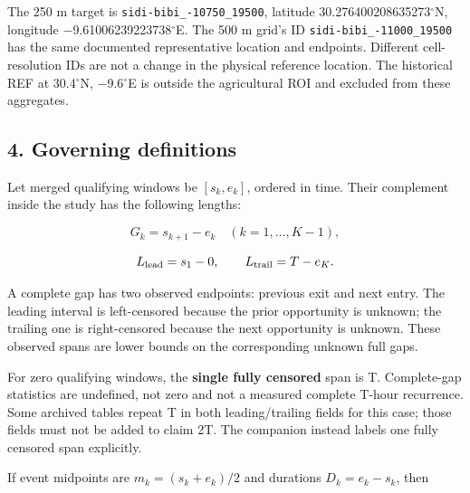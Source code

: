 \documentclass[10pt,a4paper]{article}
\numberwithin{equation}{section}
\begin{document}
\begin{sloppypar}The 250 m target is \nolinkurl{sidi-bibi_-10750_19500}, latitude 30.276400208635273\ensuremath{{}^{\circ}}N, longitude \ensuremath{-}9.61006239223738\ensuremath{{}^{\circ}}E. The 500 m grid's ID \nolinkurl{sidi-bibi_-11000_19500} has the same documented representative location and endpoints. Different cell-resolution IDs are not a change in the physical reference location. The historical REF at 30.4\ensuremath{{}^{\circ}}N, \ensuremath{-}9.6\ensuremath{{}^{\circ}}E is outside the agricultural ROI and excluded from these aggregates.\end{sloppypar}


\subsection*{4. Governing definitions}
\begin{sloppypar}Let merged qualifying windows be \([s_k,e_k]\), ordered in time. Their complement inside the study has the following lengths:\end{sloppypar}


\begin{equation}G_k=s_{k+1}-e_k\quad(k=1,\ldots,K-1),\label{eq:complete-gap}\end{equation}

\begin{equation}L_{\rm lead}=s_1-0,\qquad L_{\rm trail}=T-e_K.\label{eq:ch9-2}\end{equation}

\begin{sloppypar}A complete gap has two observed endpoints: previous exit and next entry. The leading interval is left-censored because the prior opportunity is unknown; the trailing one is right-censored because the next opportunity is unknown. These observed spans are lower bounds on the corresponding unknown full gaps.\end{sloppypar}


\begin{sloppypar}For zero qualifying windows, the \textbf{single fully censored} span is T. Complete-gap statistics are undefined, not zero and not a measured complete T-hour recurrence. Some archived tables repeat T in both leading/trailing fields for this case; those fields must not be added to claim 2T. The companion instead labels one fully censored span explicitly.\end{sloppypar}


\begin{sloppypar}If event midpoints are \(m_k=(s_k+e_k)/2\) and durations \(D_k=e_k-s_k\), then\end{sloppypar}
\end{document}

